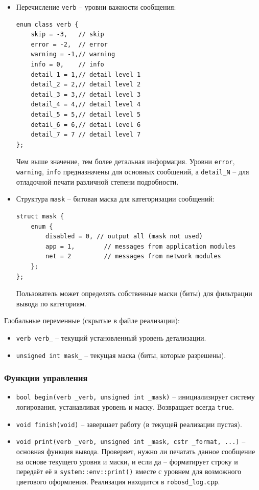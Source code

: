 \documentclass[a4paper,12pt]{article}
\begin{document}
\begin{itemize}
    \item Перечисление \texttt{verb} -- уровни важности сообщения:
    \begin{lstlisting}
enum class verb { 
    skip = -3,   // skip
    error = -2,  // error
    warning = -1,// warning
    info = 0,    // info
    detail_1 = 1,// detail level 1
    detail_2 = 2,// detail level 2
    detail_3 = 3,// detail level 3
    detail_4 = 4,// detail level 4
    detail_5 = 5,// detail level 5
    detail_6 = 6,// detail level 6
    detail_7 = 7 // detail level 7
};
    \end{lstlisting}
    Чем выше значение, тем более детальная информация. Уровни \texttt{error}, \texttt{warning}, \texttt{info} предназначены для основных сообщений, а \texttt{detail\_N} -- для отладочной печати различной степени подробности.

    \item Структура \texttt{mask} -- битовая маска для категоризации сообщений:
    \begin{lstlisting}
struct mask {
    enum {
        disabled = 0, // output all (mask not used)
        app = 1,        // messages from application modules
        net = 2         // messages from network modules
    };
};
    \end{lstlisting}
    Пользователь может определять собственные маски (биты) для фильтрации вывода по категориям.
\end{itemize}

Глобальные переменные (скрытые в файле реализации):
\begin{itemize}
    \item \texttt{verb verb\_} -- текущий установленный уровень детализации.
    \item \texttt{unsigned int mask\_} -- текущая маска (биты, которые разрешены).
\end{itemize}

\subsubsection{Функции управления}

\begin{itemize}
    \item \texttt{bool begin(verb \_verb, unsigned int \_mask)} -- инициализирует систему логирования, устанавливая уровень и маску. Возвращает всегда \texttt{true}.
    \item \texttt{void finish(void)} -- завершает работу (в текущей реализации пустая).
    \item \texttt{void print(verb \_verb, unsigned int \_mask, cstr \_format, ...)} -- основная функция вывода. Проверяет, нужно ли печатать данное сообщение на основе текущего уровня и маски, и если да -- форматирует строку и передаёт её в \texttt{system::env::print()} вместе с уровнем для возможного цветового оформления. Реализация находится в \texttt{robosd\_log.cpp}.
\end{itemize}
\end{document}
